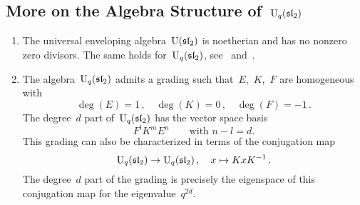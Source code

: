 \documentclass[a4paper, 11pt, oneside]{scrartcl}
\begin{document}
\subsection{More on the Algebra Structure of~\texorpdfstring{$\operatorname{U}_q(\mathfrak{sl}_2)$}{Uq(sl2)}}

\label{algebra structure of quantum sl2}
\begin{remark}
  \leavevmode
  \begin{enumerate}
    \item
      The universal enveloping algebra~$\operatorname{U}(\mathfrak{sl}_2)$ is noetherian and has no nonzero zero divisors.
      The same holds for~$\operatorname{U}_q(\mathfrak{sl}_2)$, see~\cite[Proposition~VI.1.4]{kassel_quantum} and~\cite[Propositon~1.8]{jantzen_quantum}.
    \item
      The algebra~$\operatorname{U}_q(\mathfrak{sl}_2)$ admits a grading such that~$E$,~$K$,~$F$ are homogeneous with
      \[
        \deg(E) = 1 \,,
        \quad
        \deg(K) = 0 \,,
        \quad
        \deg(F) = -1 \,.
      \]
      The degree~$d$ part of~$\operatorname{U}_q(\mathfrak{sl}_2)$ has the vector space basis
      \[
        F^l K^m E^n
        \qquad
        \text{with~$n - l = d$.}
      \]
      This grading can also be characterized in terms of the conjugation map
      \[
        \operatorname{U}_q(\mathfrak{sl}_2)
        \to
        \operatorname{U}_q(\mathfrak{sl}_2) \,,
        \quad
        x
        \mapsto
        K x K^{-1} \,.
      \]
      The degree~$d$ part of the grading is precisely the eigenspace of this conjugation map for the eigenvalue~$q^{2d}$.
  \end{enumerate}
\end{remark}
\end{document}
